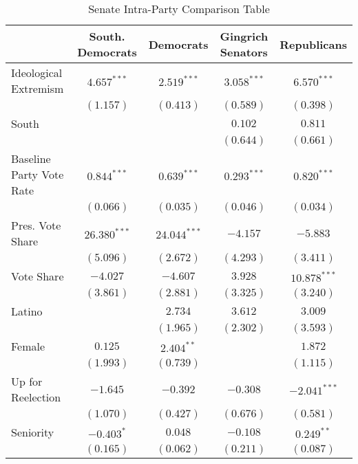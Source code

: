 \documentclass[12pt]{article}
\begin{document}
\begin{table}[!ht]
	\small
	\begin{center}
		\caption{Senate Intra-Party Comparison Table}
		\begin{tabular}{l c c c c }
			\hline
			 & South. Democrats & Democrats & Gingrich Senators & Republicans \\
			\hline
			Ideological Extremism & $4.657^{***}$  & $2.519^{***}$  & $3.058^{***}$  & $6.570^{***}$  \\
			& $(1.157)$      & $(0.413)$      & $(0.589)$      & $(0.398)$      \\
			South                  &                &                & $0.102$        & $0.811$        \\
			&                &                & $(0.644)$      & $(0.661)$      \\
			Baseline Party Vote Rate              & $0.844^{***}$  & $0.639^{***}$  & $0.293^{***}$  & $0.820^{***}$  \\
			& $(0.066)$      & $(0.035)$      & $(0.046)$      & $(0.034)$      \\
			Pres. Vote Share      & $26.380^{***}$ & $24.044^{***}$ & $-4.157$       & $-5.883$       \\
			& $(5.096)$      & $(2.672)$      & $(4.293)$      & $(3.411)$      \\
			Vote Share            & $-4.027$       & $-4.607$       & $3.928$        & $10.878^{***}$ \\
			& $(3.861)$      & $(2.881)$      & $(3.325)$      & $(3.240)$      \\
			Latino                 &                & $2.734$        & $3.612$        & $3.009$        \\
			&                & $(1.965)$      & $(2.302)$      & $(3.593)$      \\
			Female                 & $0.125$        & $2.404^{**}$   &                & $1.872$        \\
			& $(1.993)$      & $(0.739)$      &                & $(1.115)$      \\
			Up for Reelection    & $-1.645$       & $-0.392$       & $-0.308$       & $-2.041^{***}$ \\
			& $(1.070)$      & $(0.427)$      & $(0.676)$      & $(0.581)$      \\
			Seniority              & $-0.403^{*}$   & $0.048$        & $-0.108$       & $0.249^{**}$   \\
			& $(0.165)$      & $(0.062)$      & $(0.211)$      & $(0.087)$      \\

\end{tabular}
\end{center}
\end{table}
\end{document}
